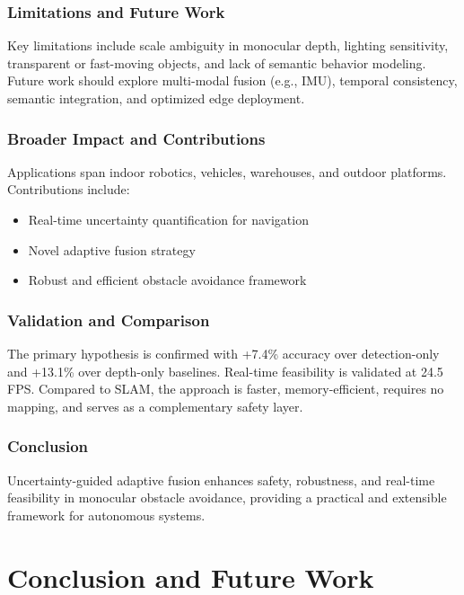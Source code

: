 \documentclass[12pt,oneside]{book}
\begin{document}
\subsection{Limitations and Future Work}

Key limitations include scale ambiguity in monocular depth, lighting sensitivity, transparent or fast-moving objects, and lack of semantic behavior modeling. Future work should explore multi-modal fusion (e.g., IMU), temporal consistency, semantic integration, and optimized edge deployment.

\subsection{Broader Impact and Contributions}

Applications span indoor robotics, vehicles, warehouses, and outdoor platforms. Contributions include:

\begin{itemize}
\item Real-time uncertainty quantification for navigation
\item Novel adaptive fusion strategy
\item Robust and efficient obstacle avoidance framework
\end{itemize}

\subsection{Validation and Comparison}

The primary hypothesis is confirmed with +7.4\% accuracy over detection-only and +13.1\% over depth-only baselines. Real-time feasibility is validated at 24.5 FPS. Compared to SLAM, the approach is faster, memory-efficient, requires no mapping, and serves as a complementary safety layer.

\subsection{Conclusion}

Uncertainty-guided adaptive fusion enhances safety, robustness, and real-time feasibility in monocular obstacle avoidance, providing a practical and extensible framework for autonomous systems.

\chapter{Conclusion and Future Work}
\end{document}
